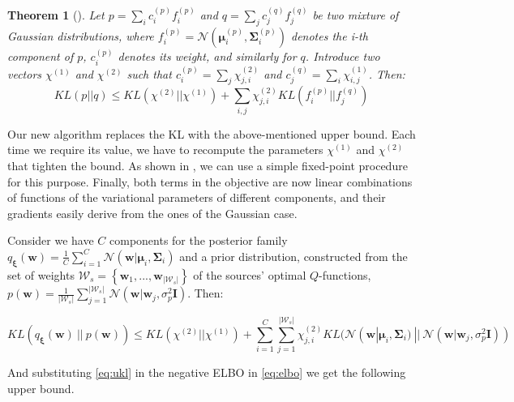 \documentclass{article}
\newtheorem{theorem}{Theorem}
\newcommand{\abs}[1]{\left\lvert #1 \right\rvert}
\begin{document}
\begin{theorem}[\cite{hershey2007approximating}]\label{th:ukl}
Let $p = \sum_{i} c_i^{(p)} f_i^{(p)}$ and $q = \sum_{j} c_j^{(q)} f_j^{(q)}$ be two mixture of Gaussian distributions, where $f_i^{(p)} = \mathcal{N}(\bm{\mu}_i^{(p)},\bm{\Sigma}_i^{(p)})$ denotes the i-th component of $p$, $c_i^{(p)}$ denotes its weight, and similarly for $q$. Introduce two vectors $\chi^{(1)}$ and $\chi^{(2)}$ such that $c_i^{(p)} = \sum_j \chi^{(2)}_{j,i}$ and $c_j^{(q)} = \sum_i \chi^{(1)}_{i,j}$. Then:
\begin{equation}
KL(p||q) \leq KL(\chi^{(2)}||\chi^{(1)}) + \sum_{i,j} \chi^{(2)}_{j,i}KL(f_i^{(p)}||f_j^{(q)})
\end{equation}
\end{theorem}
Our new algorithm replaces the KL with the above-mentioned upper bound. Each time we require its value, we have to recompute the parameters $\chi^{(1)}$ and $\chi^{(2)}$ that tighten the bound. As shown in \cite{hershey2007approximating}, we can use a simple fixed-point procedure for this purpose. Finally, both terms in the objective are now linear combinations of functions of the variational parameters of different components, and their gradients easily derive from the ones of the Gaussian case.

Consider we have $C$ components for the posterior family $q_{\bm{\xi}}(\bm{w}) = \frac{1}{C}\sum_{i=1}^C\mathcal{N}(\bm{w}|\bm{\mu}_i,\bm{\Sigma}_i)$ and a prior distribution, constructed from the set of weights $\mathcal{W}_s = \left\lbrace \bm{w}_1,..., \bm{w}_{|\mathcal{W}_s|} \right\rbrace$ of the sources' optimal $Q$-functions, $p(\bm{w}) = \frac{1}{\abs{\mathcal{W}_s}}\sum_{j=1}^{|\mathcal{W}_s|}\mathcal{N}(\bm{w}|\bm{w}_j,\sigma_p^2\bm{I})$. Then:

\begin{equation}\label{eq:ukl}
KL\left(q_{\bm{\xi}}(\bm{w})\ ||\ p(\bm{w})\right) \leq KL(\chi^{(2)}||\chi^{(1)}) + \sum_{i=1}^C\sum_{j=1}^{|\mathcal{W}_s|} \chi_{j,i}^{(2)}KL(\mathcal{N}(\bm{w}|\bm{\mu}_i, \bm{\Sigma}_i)\ ||\ \mathcal{N}(\bm{w}|\bm{w}_j, \sigma_p^2\bm{I}))
\end{equation}

And substituting \eqref{eq:ukl} in the negative ELBO in \eqref{eq:elbo} we get the following upper bound.
\end{document}
